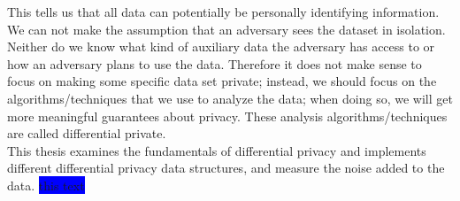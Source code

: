 \documentclass[11pt]{article}
\theoremstyle{definition}
\begin{document}
\noindent This tells us that all data can potentially be personally identifying information. We can not make the assumption that an adversary sees the dataset in isolation. Neither do we know what kind of auxiliary data the adversary has access to or how an adversary plans to use the data. Therefore it does not make sense to focus on making some specific data set private;  instead, we should focus on the algorithms/techniques that we use to analyze the data; when doing so, we will get more meaningful guarantees about privacy.  These analysis algorithms/techniques are called differential private.\\

This thesis examines the fundamentals of differential privacy and implements different differential privacy data structures, and measure the noise added to the data. \colorbox{blue}{this text}


\end{document}

